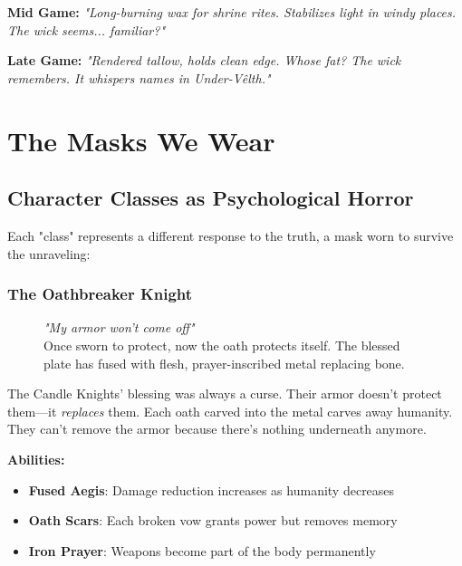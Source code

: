 \documentclass[11pt,a4paper,twoside]{book}
\begin{document}
\begin{tcolorbox}[itembox={Festival Candle}]
\textbf{Mid Game:} \textit{"Long-burning wax for shrine rites. Stabilizes light in windy places. The wick seems... familiar?"}
\end{tcolorbox}

\begin{tcolorbox}[horrorbox={Festival Candle}]
\textbf{Late Game:} \textit{"Rendered tallow, holds clean edge. Whose fat? The wick remembers. It whispers names in Under-Vêlth."}
\end{tcolorbox}

\chapter{The Masks We Wear}

\section{Character Classes as Psychological Horror}

Each "class" represents a different response to the truth, a mask worn to survive the unraveling:

\subsection{The Oathbreaker Knight}

\begin{figure}
    \centering
    \begin{tcolorbox}[horrorbox={}, boxrule=2pt, width=\linewidth]
    \textit{"My armor won't come off"}\\
    \vspace{0.5em}
    Once sworn to protect, now the oath protects itself. The blessed plate has fused with flesh, prayer-inscribed metal replacing bone.
    \end{tcolorbox}
\end{figure}

The Candle Knights' blessing was always a curse. Their armor doesn't protect them—it \textit{replaces} them. Each oath carved into the metal carves away humanity. They can't remove the armor because there's nothing underneath anymore.

\textbf{Abilities:}
\begin{itemize}
    \item \textbf{Fused Aegis}: Damage reduction increases as humanity decreases
    \item \textbf{Oath Scars}: Each broken vow grants power but removes memory
    \item \textbf{Iron Prayer}: Weapons become part of the body permanently
\end{itemize}
\end{document}
